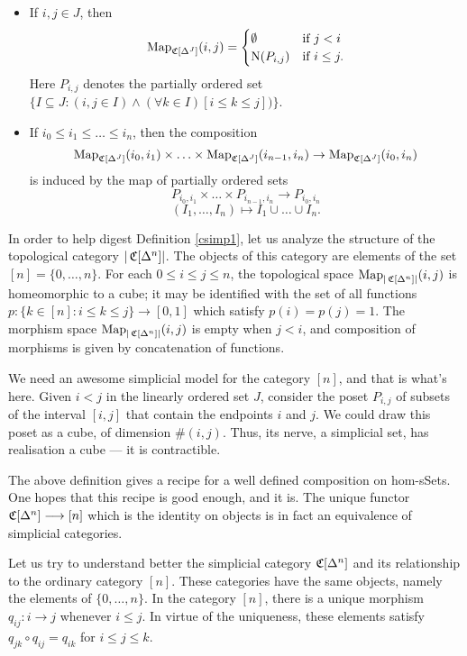 \begin{1.1.5 inf-cats vs simplicial cats}
\begin{definition}
\begin{itemize}
\item If $i,j \in J$, then
$$\operatorname{{Map}}_{\operatorname{\mathfrak{C}}[\Delta^J]}(i,j) = \begin{cases} \emptyset & \text{if } j < i \\
\operatorname{N}(P_{i,j}) & \text{if } i \leq j. \end{cases}$$
Here $P_{i,j}$ denotes the partially ordered set $\{ I \subseteq J: (i,j \in I) \wedge (
\forall k \in I) [i \leq k \leq j] ) \}$.

\item If $i_0 \leq i_1 \leq \ldots \leq i_n$, then the composition
$$ \operatorname{{Map}}_{\operatorname{\mathfrak{C}}[\Delta^J]}(i_0,i_1) \times \ldots \times
\operatorname{{Map}}_{\operatorname{\mathfrak{C}}[\Delta^J]}(i_{n-1},i_n) \rightarrow
\operatorname{{Map}}_{\operatorname{\mathfrak{C}}[\Delta^J]}(i_0,i_n)$$ is induced by the map of
partially ordered sets
$$ P_{i_0,i_1} \times \ldots  \times P_{i_{n-1},i_n} \rightarrow P_{i_0,i_n}$$
$$ ( I_1, \ldots, I_n ) \mapsto I_1 \cup \ldots \cup I_n.$$
\end{itemize}
\end{definition}

In order to help digest Definition \ref{csimp1}, let us analyze the structure of the
topological category $| \operatorname{\mathfrak{C}}[ \Delta^n ] |$. The objects of this category
are elements of the set $[n] = \{ 0, \ldots, n\}$. For each
$0 \leq i \leq j \leq n$, the topological space $\operatorname{{Map}}_{ |\operatorname{\mathfrak{C}}[\Delta^n]| }(i,j)$ is homeomorphic to a cube; it may be identified with the set of all functions $p: \{ k \in [n]: i \leq k \leq j \} \rightarrow [0,1]$ which satisfy $p(i) = p(j) =
1$. The morphism space $\operatorname{{Map}}_{ | \operatorname{\mathfrak{C}}[\Delta^n] |}(i,j)$ is empty when
$j < i$, and composition of morphisms is given by concatenation of functions.
\begin{shaded}
We need an awesome simplicial model for the category $[n]$, and that is what's here. Given $i<j$ in the linearly ordered set $J$, consider the poset $P_{i,j}$ of subsets of the interval $[i,j]$ that contain the endpoints $i$ and $j$. We could draw this poset as a cube, of dimension $\#(i,j)$. Thus, its nerve, a simplicial set, has realisation a cube --- it is contractible.

The above definition gives a recipe for a well defined composition on hom-sSets. One hopes that this recipe is good enough, and it is. The unique functor $\operatorname{\mathfrak{C}}[\Delta^n]\longrightarrow[n]$ which is the identity on objects is in fact an equivalence of simplicial categories.
\end{shaded}


\begin{remark}\label{conervexp}
Let us try to understand better the simplicial category $\operatorname{\mathfrak{C}}[\Delta^n]$ and its relationship to the ordinary category $[n]$. These categories have the same objects, namely the elements of $\{ 0, \ldots, n\}$.
In the category $[n]$, there is a unique morphism $q_{ij}: i \rightarrow j$ whenever $i \leq j$. In virtue of the uniqueness, these elements satisfy $q_{jk} \circ q_{ij} = q_{ik}$ for $i \leq j \leq k$.


\end{remark}
\end{1.1.5 inf-cats vs simplicial cats}
